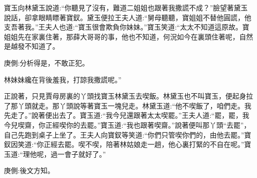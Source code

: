\begin{parag}
    寶玉向林黛玉說道:“你聽見了沒有，難道二姐姐也跟著我撒謊不成？”臉望著黛玉說話，卻拿眼睛瞟著寶釵。黛玉便拉王夫人道:“舅母聽聽，寶姐姐不替他圓謊，他支吾著我。”王夫人也道:“寶玉很會欺負你妹妹。”寶玉笑道:“太太不知道這原故。寶姐姐先在家裏住著，那薛大哥哥的事，他也不知道，何況如今在裏頭住著呢，自然是越發不知道了。\begin{note}庚側:分析得是，不敢正犯。\end{note}林妹妹纔在背後羞我，打諒我撒謊呢。”
\end{parag}


\begin{parag}
    正說著，只見賈母房裏的丫頭找寶玉林黛玉去喫飯。林黛玉也不叫寶玉，便起身拉了那丫頭就走。那丫頭說等著寶玉一塊兒走。林黛玉道:“他不喫飯了，咱們走。我先走了。”說著便出去了。寶玉道:“我今兒還跟著太太喫罷。”王夫人道:“罷，罷，我今兒喫齋，你正經喫你的去罷。”寶玉道:“我也跟著喫齋。”說著便叫那丫頭“去罷”，自己先跑到桌子上坐了。王夫人向寶釵等笑道:“你們只管喫你們的，由他去罷。”寶釵因笑道:“你正經去罷。喫不喫，陪著林姑娘走一趟，他心裏打緊的不自在呢。”寶玉道:“理他呢，過一會子就好了。”\begin{note}庚側:後文方知。\end{note}
\end{parag}


